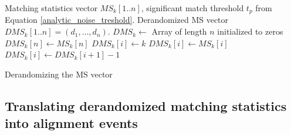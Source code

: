 \documentclass[unnumsec,webpdf,contemporary,large]{oup-authoring-template}%
\theoremstyle{thmstyleone}%
\theoremstyle{thmstyletwo}%
\theoremstyle{thmstylethree}%
\begin{document}

\begin{algorithm}[t]
\begin{algorithmic}[1]
\small
\Require Matching statistics vector $MS_k[1..n]$, significant match threshold $t_p$ from Equation \ref{analytic_noise_treshold}.
\Ensure Derandomized MS vector $DMS_k[1..n] = (d_1, \ldots, d_{n})$.
\State $DMS_k \leftarrow $ Array of length $n$ initialized to zeros
\State $DMS_k[n] \gets MS_k[n]$
\State $DMS_k[i] \gets k$
    \State $DMS_k[i] \gets MS_k[i]$
\Else
    \State $DMS_k[i] \gets DMS_k[i+1]-1$
\EndIf
\EndFor
\caption{\small Derandomizing the MS vector} 
\label{alg:derandomized-MS}
\end{algorithmic}
\end{algorithm}

\subsection{Translating derandomized matching statistics into alignment events}
 


\end{document}
